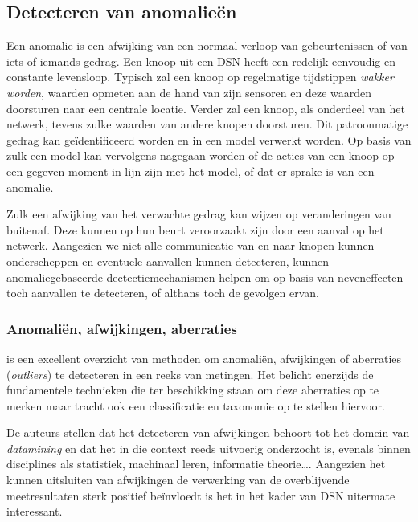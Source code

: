 
\subsection{Detecteren van anomalie\"en}
\label{subsection:anomaly}

Een anomalie is een afwijking van een normaal verloop van gebeurtenissen of van
iets of iemands gedrag. Een knoop uit een DSN heeft een redelijk eenvoudig en
constante levensloop. Typisch zal een knoop op regelmatige tijdstippen
\emph{wakker worden}, waarden opmeten aan de hand van zijn sensoren en deze
waarden doorsturen naar een centrale locatie. Verder zal een knoop, als
onderdeel van het netwerk, tevens zulke waarden van andere knopen doorsturen.
Dit patroonmatige gedrag kan ge\"identificeerd worden en in een model verwerkt
worden. Op basis van zulk een model kan vervolgens nagegaan worden of de acties
van een knoop op een gegeven moment in lijn zijn met het model, of dat er
sprake is van een anomalie.

Zulk een afwijking van het verwachte gedrag kan wijzen op veranderingen van
buitenaf. Deze kunnen op hun beurt veroorzaakt zijn door een aanval op het
netwerk. Aangezien we niet alle communicatie van en naar knopen kunnen
onderscheppen en eventuele aanvallen kunnen detecteren, kunnen
anomaliegebaseerde dectectiemechanismen helpen om op basis van neveneffecten
toch aanvallen te detecteren, of althans toch de gevolgen ervan.

\subsubsection*{Anomali\"en, afwijkingen, aberraties}
\label{subsubsection:outlier}

\citep{zhang2010outlier} is een excellent overzicht van methoden om anomali\"en,
afwijkingen of aberraties (\emph{outliers}) te detecteren in een reeks
van metingen. Het belicht enerzijds de fundamentele technieken die ter
beschikking staan om deze aberraties op te merken maar tracht ook een
classificatie en taxonomie op te stellen hiervoor.

De auteurs stellen dat het detecteren van afwijkingen behoort tot het domein
van \emph{datamining} en dat het in die context reeds uitvoerig onderzocht is,
evenals binnen disciplines als statistiek, machinaal leren, informatie
theorie\dots. Aangezien het kunnen uitsluiten van afwijkingen de verwerking van
de overblijvende meetresultaten sterk positief be\"invloedt is het in het kader
van DSN uitermate interessant.

